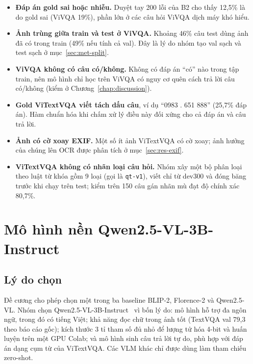 \begin{itemize}
  \item \textbf{Đáp án gold sai hoặc nhiễu.} Duyệt tay 200 lỗi của B2 cho thấy
  12,5\% là do gold sai (ViVQA 19\%), phần lớn ở các câu hỏi ViVQA dịch máy khó
  hiểu.
  \item \textbf{Ảnh trùng giữa train và test ở ViVQA.} Khoảng 46\% câu test dùng
  ảnh đã có trong train (49\% nếu tính cả val). Đây là lý do nhóm tạo val sạch
  và test sạch ở mục~\ref{sec:met-split}.
  \item \textbf{ViVQA không có câu có/không.} Không có đáp án ``có'' nào trong
  tập train, nên mô hình chỉ học trên ViVQA có nguy cơ quên cách trả lời câu
  có/không (kiểm ở Chương~\ref{chap:discussion}).
  \item \textbf{Gold ViTextVQA viết tách dấu câu}, ví dụ ``0983 . 651 888''
  (25,7\% đáp án). Hàm chuẩn hóa khi chấm xử lý điều này đối xứng cho cả đáp án
  và câu trả lời.
  \item \textbf{Ảnh có cờ xoay EXIF.} Một số ít ảnh ViTextVQA có cờ xoay; ảnh
  hưởng của chúng lên OCR được phân tích ở mục~\ref{sec:res-exif}.
  \item \textbf{ViTextVQA không có nhãn loại câu hỏi.} Nhóm xây một bộ phân loại
  theo luật từ khóa gồm 9 loại (gọi là \texttt{qt-v1}), viết chỉ từ dev300 và
  đóng băng trước khi chạy trên test; kiểm trên 150 câu gán nhãn mù đạt độ chính
  xác 80,7\%.
\end{itemize}

\section{Mô hình nền Qwen2.5-VL-3B-Instruct}
\label{sec:met-baseline}

\subsection{Lý do chọn}

Đề cương cho phép chọn một trong ba baseline BLIP-2, Florence-2 và Qwen2.5-VL.
Nhóm chọn Qwen2.5-VL-3B-Instruct~\cite{bai2025qwen25vl} vì bốn lý do: mô hình hỗ
trợ đa ngôn ngữ, trong đó có tiếng Việt; khả năng đọc chữ trong ảnh tốt (TextVQA
val 79,3 theo báo cáo gốc); kích thước 3 tỉ tham số đủ nhỏ để lượng tử hóa 4-bit
và huấn luyện trên một GPU Colab; và mô hình sinh câu trả lời tự do, phù hợp với
đáp án dạng cụm từ của ViTextVQA. Các VLM khác chỉ được dùng làm tham chiếu
zero-shot.

